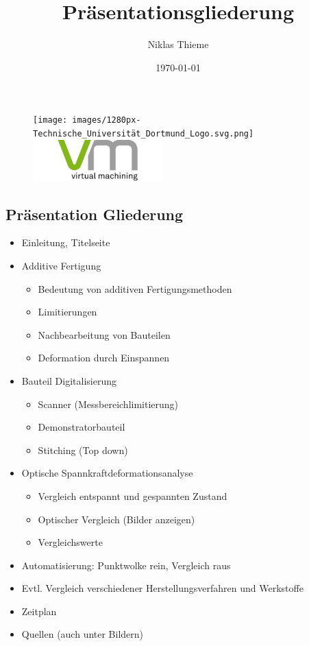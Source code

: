 \documentclass[11pt]{article}
\title{Präsentationsgliederung}
\author{Niklas Thieme}
\date{\today}
\begin{document}
\begin{figure}[t]
    \texttt{[image: images/1280px-Technische\_Universität\_Dortmund\_Logo.svg.png]}\hfill
    \includegraphics[width=5cm]{images/vmLogo.png}
\end{figure}

\begin{center}
    \section*{Präsentation Gliederung}
\end{center}

\begin{itemize}
    \item Einleitung, Titelseite
    \item Additive Fertigung
    \begin{itemize}
        \item Bedeutung von additiven Fertigungsmethoden
        \item Limitierungen
        \item Nachbearbeitung von Bauteilen
        \item Deformation durch Einspannen
    \end{itemize}
    \item Bauteil Digitalisierung
    \begin{itemize}
        \item Scanner (Messbereichlimitierung)
        \item Demonstratorbauteil
        \item Stitching (Top down)
    \end{itemize} 
    \item Optische Spannkraftdeformationsanalyse
    \begin{itemize}
        \item Vergleich entspannt und gespannten Zustand
        \item Optischer Vergleich (Bilder anzeigen)
        \item Vergleichswerte
    \end{itemize}
    \item Automatisierung: Punktwolke rein, Vergleich raus
    \item Evtl. Vergleich verschiedener Herstellungsverfahren und Werkstoffe
    \item Zeitplan
    \item Quellen (auch unter Bildern)
\end{itemize}


\newpage


\end{document}

